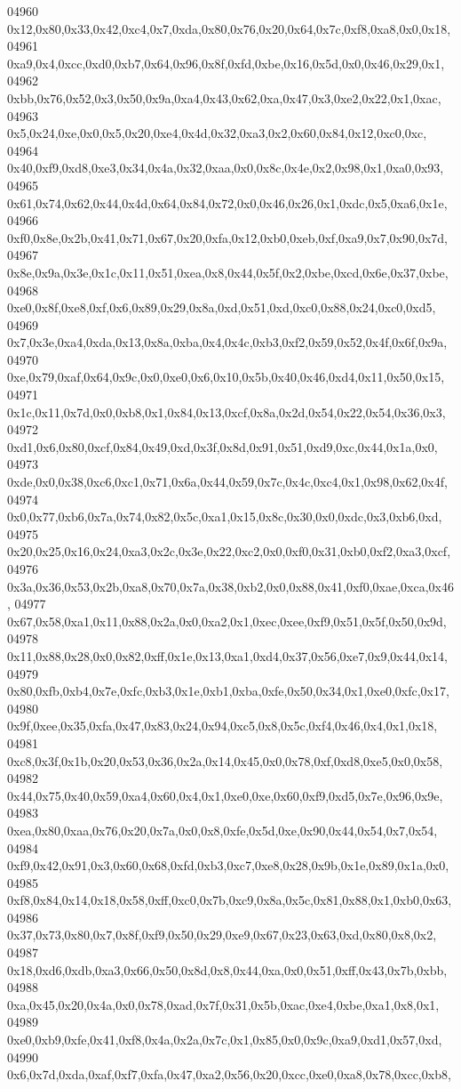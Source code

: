 \begin{DoxyCode}
04960   0x12,0x80,0x33,0x42,0xc4,0x7,0xda,0x80,0x76,0x20,0x64,0x7c,0xf8,0xa8,0x0,0x18,
04961   0xa9,0x4,0xcc,0xd0,0xb7,0x64,0x96,0x8f,0xfd,0xbe,0x16,0x5d,0x0,0x46,0x29,0x1,
04962   0xbb,0x76,0x52,0x3,0x50,0x9a,0xa4,0x43,0x62,0xa,0x47,0x3,0xe2,0x22,0x1,0xac,
04963   0x5,0x24,0xe,0x0,0x5,0x20,0xe4,0x4d,0x32,0xa3,0x2,0x60,0x84,0x12,0xc0,0xc,
04964   0x40,0xf9,0xd8,0xe3,0x34,0x4a,0x32,0xaa,0x0,0x8c,0x4e,0x2,0x98,0x1,0xa0,0x93,
04965   0x61,0x74,0x62,0x44,0x4d,0x64,0x84,0x72,0x0,0x46,0x26,0x1,0xdc,0x5,0xa6,0x1e,
04966   0xf0,0x8e,0x2b,0x41,0x71,0x67,0x20,0xfa,0x12,0xb0,0xeb,0xf,0xa9,0x7,0x90,0x7d,
04967   0x8e,0x9a,0x3e,0x1c,0x11,0x51,0xea,0x8,0x44,0x5f,0x2,0xbe,0xcd,0x6e,0x37,0xbe,
04968   0xe0,0x8f,0xe8,0xf,0x6,0x89,0x29,0x8a,0xd,0x51,0xd,0xc0,0x88,0x24,0xc0,0xd5,
04969   0x7,0x3e,0xa4,0xda,0x13,0x8a,0xba,0x4,0x4c,0xb3,0xf2,0x59,0x52,0x4f,0x6f,0x9a,
04970   0xe,0x79,0xaf,0x64,0x9c,0x0,0xe0,0x6,0x10,0x5b,0x40,0x46,0xd4,0x11,0x50,0x15,
04971   0x1c,0x11,0x7d,0x0,0xb8,0x1,0x84,0x13,0xcf,0x8a,0x2d,0x54,0x22,0x54,0x36,0x3,
04972   0xd1,0x6,0x80,0xcf,0x84,0x49,0xd,0x3f,0x8d,0x91,0x51,0xd9,0xc,0x44,0x1a,0x0,
04973   0xde,0x0,0x38,0xc6,0xc1,0x71,0x6a,0x44,0x59,0x7c,0x4c,0xc4,0x1,0x98,0x62,0x4f,
04974   0x0,0x77,0xb6,0x7a,0x74,0x82,0x5c,0xa1,0x15,0x8c,0x30,0x0,0xdc,0x3,0xb6,0xd,
04975   0x20,0x25,0x16,0x24,0xa3,0x2c,0x3e,0x22,0xc2,0x0,0xf0,0x31,0xb0,0xf2,0xa3,0xcf,
04976   0x3a,0x36,0x53,0x2b,0xa8,0x70,0x7a,0x38,0xb2,0x0,0x88,0x41,0xf0,0xae,0xca,0x46,
04977   0x67,0x58,0xa1,0x11,0x88,0x2a,0x0,0xa2,0x1,0xec,0xee,0xf9,0x51,0x5f,0x50,0x9d,
04978   0x11,0x88,0x28,0x0,0x82,0xff,0x1e,0x13,0xa1,0xd4,0x37,0x56,0xe7,0x9,0x44,0x14,
04979   0x80,0xfb,0xb4,0x7e,0xfc,0xb3,0x1e,0xb1,0xba,0xfe,0x50,0x34,0x1,0xe0,0xfc,0x17,
04980   0x9f,0xee,0x35,0xfa,0x47,0x83,0x24,0x94,0xc5,0x8,0x5c,0xf4,0x46,0x4,0x1,0x18,
04981   0xc8,0x3f,0x1b,0x20,0x53,0x36,0x2a,0x14,0x45,0x0,0x78,0xf,0xd8,0xe5,0x0,0x58,
04982   0x44,0x75,0x40,0x59,0xa4,0x60,0x4,0x1,0xe0,0xe,0x60,0xf9,0xd5,0x7e,0x96,0x9e,
04983   0xea,0x80,0xaa,0x76,0x20,0x7a,0x0,0x8,0xfe,0x5d,0xe,0x90,0x44,0x54,0x7,0x54,
04984   0xf9,0x42,0x91,0x3,0x60,0x68,0xfd,0xb3,0xc7,0xe8,0x28,0x9b,0x1e,0x89,0x1a,0x0,
04985   0xf8,0x84,0x14,0x18,0x58,0xff,0xc0,0x7b,0xc9,0x8a,0x5c,0x81,0x88,0x1,0xb0,0x63,
04986   0x37,0x73,0x80,0x7,0x8f,0xf9,0x50,0x29,0xe9,0x67,0x23,0x63,0xd,0x80,0x8,0x2,
04987   0x18,0xd6,0xdb,0xa3,0x66,0x50,0x8d,0x8,0x44,0xa,0x0,0x51,0xff,0x43,0x7b,0xbb,
04988   0xa,0x45,0x20,0x4a,0x0,0x78,0xad,0x7f,0x31,0x5b,0xac,0xe4,0xbe,0xa1,0x8,0x1,
04989   0xe0,0xb9,0xfe,0x41,0xf8,0x4a,0x2a,0x7c,0x1,0x85,0x0,0x9c,0xa9,0xd1,0x57,0xd,
04990   0x6,0x7d,0xda,0xaf,0xf7,0xfa,0x47,0xa2,0x56,0x20,0xcc,0xe0,0xa8,0x78,0xcc,0xb8,

\end{DoxyCode}
